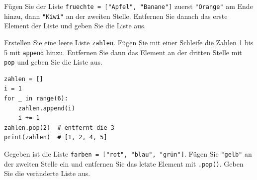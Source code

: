 \begin{myexercise}
	Fügen Sie der Liste \lstinline|fruechte = ["Apfel", "Banane"]| zuerst \lstinline|"Orange"| am Ende hinzu, dann \lstinline|"Kiwi"| an der zweiten Stelle. Entfernen Sie danach das erste Element der Liste und geben Sie die Liste aus.

	\begin{myanswer}
		
	\end{myanswer}
\end{myexercise}

\begin{myexercise}
	Erstellen Sie eine leere Liste \lstinline|zahlen|. Fügen Sie mit einer Schleife die Zahlen 1 bis 5 mit \lstinline|append| hinzu. Entfernen Sie dann das Element an der dritten Stelle mit \lstinline|pop| und geben Sie die Liste aus.

	\begin{myanswer}
		\begin{lstlisting}
zahlen = []
i = 1
for _ in range(6):
    zahlen.append(i)
    i += 1
zahlen.pop(2)  # entfernt die 3
print(zahlen)  # [1, 2, 4, 5]
\end{lstlisting}
	\end{myanswer}
\end{myexercise}

\begin{myexercise}
	Gegeben ist die Liste \lstinline|farben = ["rot", "blau", "grün"]|. Fügen Sie \lstinline|"gelb"| an der zweiten Stelle ein und entfernen Sie das letzte Element mit \lstinline|.pop()|. Geben Sie die veränderte Liste aus.

	\begin{myanswer}
		
	\end{myanswer}
\end{myexercise}


